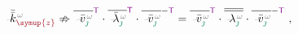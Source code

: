\begin{align} \label{eq:kz-non_diagonalization}
	\Xint{\begin{smallmatrix} ~ \\ {}^{}_{\mathcolor{gray}{-}} \\ ~ \end{smallmatrix}}{15}{\bar{\bar{k}}}_{\textcolor{Maroon}{\symup{z}}}^{\;\! \mathcolor{gray}{\omega}} \nRightarrow \overline{\Xint{\begin{smallmatrix} ~ \\ {}^{}_{\mathcolor{gray}{-}} \\ ~ \end{smallmatrix}}{15}{\bar{v}}^{\;\!\mathcolor{gray}{\omega}}_{\textcolor{PineGreen}{\jmath}}}^{\mathsf{\textcolor{Plum}{T}}} \cdot \overline{\Xint{\begin{smallmatrix} ~ \\ {}^{}_{\mathcolor{gray}{-}} \\ ~ \end{smallmatrix}}{22}{\bar{\lambda}}^{\;\!\mathcolor{gray}{\omega}}_{\textcolor{PineGreen}{\jmath}}}^{\mathsf{\textcolor{Plum}{T}}} \cdot \overline{\Xint{\begin{smallmatrix} ~ \\ {}^{}_{\mathcolor{gray}{-}} \\ ~ \end{smallmatrix}}{15}{\bar{v}}^{\;\!\mathcolor{gray}{\omega}}_{\textcolor{PineGreen}{\jmath}}}^{-{\mathsf{\textcolor{Plum}{T}}}} = \overline{\Xint{\begin{smallmatrix} ~ \\ {}^{}_{\mathcolor{gray}{-}} \\ ~ \end{smallmatrix}}{15}{\bar{v}}^{\;\!\mathcolor{gray}{\omega}}_{\textcolor{PineGreen}{\jmath}}}^{\mathsf{\textcolor{Plum}{T}}} \cdot \overline{\overline{\Xint{\begin{smallmatrix} ~ \\ {}^{}_{\mathcolor{gray}{-}} \\ ~ \end{smallmatrix}}{22}{\lambda}^{\;\!\mathcolor{gray}{\omega}}_{\textcolor{PineGreen}{\jmath}}}} \cdot \overline{\Xint{\begin{smallmatrix} ~ \\ {}^{}_{\mathcolor{gray}{-}} \\ ~ \end{smallmatrix}}{15}{\bar{v}}^{\;\!\mathcolor{gray}{\omega}}_{\textcolor{PineGreen}{\jmath}}}^{-{\mathsf{\textcolor{Plum}{T}}}} ~,
\end{align}

